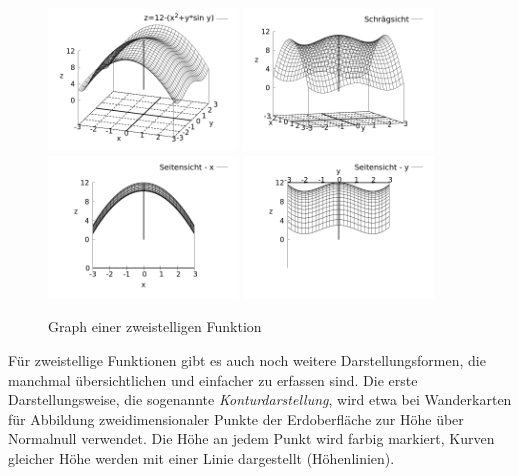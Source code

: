 \begin{figure}
    \centering
    \includegraphics[width=0.45\textwidth]{./gnuplot/example-multivariate-function-1}
    \includegraphics[width=0.45\textwidth]{./gnuplot/example-multivariate-function-2}
    \includegraphics[width=0.45\textwidth]{./gnuplot/example-multivariate-function-3}
    \includegraphics[width=0.45\textwidth]{./gnuplot/example-multivariate-function-4}
    \caption{Graph einer zweistelligen Funktion}
    \label{fig:GraphMultivarFun}
\end{figure}

Für zweistellige Funktionen gibt es auch noch weitere Darstellungsformen, die manchmal übersichtlichen und einfacher zu erfassen sind. Die erste Darstellungsweise, die sogenannte \emph{Konturdarstellung}, wird etwa bei Wanderkarten für Abbildung zweidimensionaler Punkte der Erdoberfläche zur Höhe über Normalnull verwendet. Die Höhe an jedem Punkt wird farbig markiert, Kurven gleicher Höhe werden mit einer Linie dargestellt (Höhenlinien).

